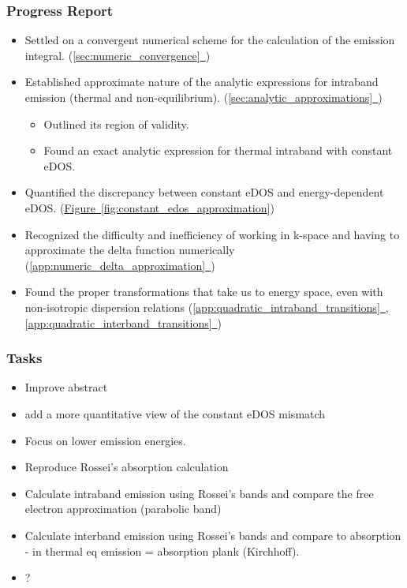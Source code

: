 \subsubsection{Progress Report}
\begin{itemize}
  \item Settled on a convergent numerical scheme for the calculation of the emission integral. (\hyperref[sec:numeric_convergence]{\ref*{sec:numeric_convergence}~})
  \item Established approximate nature of the analytic expressions for intraband emission (thermal and non-equilibrium). (\hyperref[sec:analytic_approximations]{\ref*{sec:analytic_approximations}~})
  \begin{itemize}
    \item Outlined its region of validity.
    \item Found an exact analytic expression for thermal intraband with constant eDOS.
  \end{itemize}
  \item Quantified the discrepancy between constant eDOS and energy-dependent eDOS. (\hyperref[fig:constant_edos_approximation]{Figure~\ref*{fig:constant_edos_approximation}})
  \item Recognized the difficulty and inefficiency of working in k-space and having to approximate the delta function numerically (\hyperref[app:numeric_delta_approximation]{\ref*{app:numeric_delta_approximation}~})
  \item Found the proper transformations that take us to energy space, even with non-isotropic dispersion relations (\hyperref[app:quadratic_intraband_transitions]{\ref*{app:quadratic_intraband_transitions}~}, \hyperref[app:quadratic_interband_transitions]{\ref*{app:quadratic_interband_transitions}~})
\end{itemize}

\subsubsection{Tasks}
\begin{itemize}
  \item[$\boxtimes$] Improve abstract
  \item[$\boxtimes$] add a more quantitative view of the constant eDOS mismatch
  \item[$\square$] Focus on lower emission energies.
  \item[$\square$] Reproduce Rossei's absorption calculation
  \item[$\square$] Calculate intraband emission using Rossei's bands and compare the free electron approximation (parabolic band)
  \item[$\square$] Calculate interband emission using Rossei's bands and compare to absorption - in thermal eq emission = absorption\* plank (Kirchhoff).
  \item[$\square$] ?
\end{itemize}

